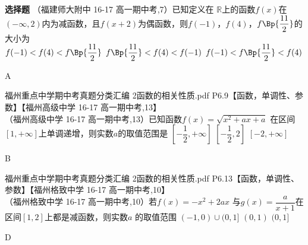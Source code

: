 \begin{exercise}{\bf 选择题}
      （福建师大附中 16-17 高一期中考,7）已知定义在 $\mathbb{R}$上的函数$f(x)$在 $(-\infty,2)$内为减函数，且$f(x+2) $为偶函数，则$f(-1)$，$f(4)$，$f\Bp{\dfrac{11}2}$的大小为\xz \\
      	  {$f(-1)<f(4)<f\Bp{\dfrac{11}2}$}
          {$f\Bp{\dfrac{11}2}<f(4)<f(-1)$}
          {$f(-1)<f\Bp{\dfrac{11}2}<f(4)$}
      \begin{answer}A\end{answer}
    \item 福州重点中学期中考真题分类汇编 2函数的相关性质.pdf P6.9【函数，单调性、参数】【福州高级中学 16-17 高一期中考,13】\\
      （福州高级中学 16-17 高一期中考,13）已知函数$f(x)=\sqrt{x^2+ax+a} $ 在区间$[1,+\infty] $上单调递增，则实数$a$的取值范围是\xz
      \xx{$[-2,-\dfrac12]$}
      		{$[-\dfrac12,+\infty] $}
          {$[-\dfrac12,2] $}
          {$[-2,+\infty] $}
      \begin{answer}B\end{answer}
    \item 福州重点中学期中考真题分类汇编 2函数的相关性质.pdf P6.13【函数，单调性、参数】【福州格致中学 16-17 高一期中考,10】\\
      （福州格致中学 16-17 高一期中考,10）若$f(x)=-x^2+2ax $
       与$g(x)=\dfrac a{x+1} $在区间$[1,2] $上都是减函数，则实数$a $ 的取值范围\xz
       		 {$(-1,0)\cup (0,1]$}
           {$(0,1) $}
           {$(0,1]$}
       \begin{answer} D \end{answer}
  \end{exercise}
